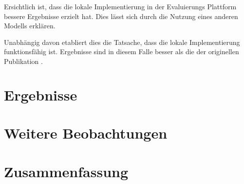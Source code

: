 Ersichtlich ist, dass die lokale Implementierung in der Evaluierungs Plattform bessere Ergebnisse erzielt hat. Dies lässt sich durch die Nutzung eines anderen Modells erklären.

Unabhängig davon etabliert dies die Tatsache, dass die lokale Implementierung funktionsfähig ist. Ergebnisse sind in diesem Falle besser als die der originellen Publikation \cite{dongSelfCollaborationCodeGeneration2024}.

\section{Ergebnisse}\label{ch:Ergebnisse}



\section{Weitere Beobachtungen}\label{ch:Weitere Beobachtungen}


\section{Zusammenfassung}\label{ch:Zusammenfassung}


